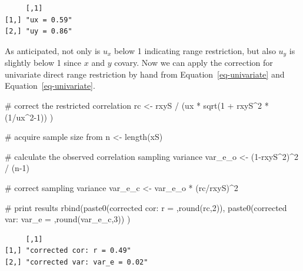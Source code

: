 \documentclass[
  letterpaper,
  DIV=11,
  numbers=noendperiod]{scrreprt}
\newenvironment{Shaded}{\begin{snugshade}}{\end{snugshade}}
\newcommand{\CommentTok}[1]{\textcolor[rgb]{0.37,0.37,0.37}{#1}}
\newcommand{\DecValTok}[1]{\textcolor[rgb]{0.68,0.00,0.00}{#1}}
\newcommand{\FunctionTok}[1]{\textcolor[rgb]{0.28,0.35,0.67}{#1}}
\newcommand{\NormalTok}[1]{\textcolor[rgb]{0.00,0.23,0.31}{#1}}
\newcommand{\OtherTok}[1]{\textcolor[rgb]{0.00,0.23,0.31}{#1}}
\newcommand{\SpecialCharTok}[1]{\textcolor[rgb]{0.37,0.37,0.37}{#1}}
\newcommand{\StringTok}[1]{\textcolor[rgb]{0.13,0.47,0.30}{#1}}
\begin{document}
\begin{verbatim}
     [,1]       
[1,] "ux = 0.59"
[2,] "uy = 0.86"
\end{verbatim}

As anticipated, not only is \(u_x\) below 1 indicating range
restriction, but also \(u_y\) is slightly below 1 since \(x\) and \(y\)
covary. Now we can apply the correction for univariate direct range
restriction by hand from Equation~\ref{eq-univariate} and
Equation~\ref{eq-univariate}.

\begin{Shaded}
\begin{Highlighting}[]
\CommentTok{\# correct the restricted correlation}
\NormalTok{rc }\OtherTok{\textless{}{-}}\NormalTok{ rxyS }\SpecialCharTok{/}\NormalTok{ (ux }\SpecialCharTok{*} \FunctionTok{sqrt}\NormalTok{(}\DecValTok{1} \SpecialCharTok{+}\NormalTok{ rxyS}\SpecialCharTok{\^{}}\DecValTok{2} \SpecialCharTok{*}\NormalTok{ (}\DecValTok{1}\SpecialCharTok{/}\NormalTok{ux}\SpecialCharTok{\^{}}\DecValTok{2{-}1}\NormalTok{)) )}

\CommentTok{\# acquire sample size from }
\NormalTok{n }\OtherTok{\textless{}{-}} \FunctionTok{length}\NormalTok{(xS)}

\CommentTok{\# calculate the observed correlation sampling variance}
\NormalTok{var\_e\_o }\OtherTok{\textless{}{-}}\NormalTok{ (}\DecValTok{1}\SpecialCharTok{{-}}\NormalTok{rxyS}\SpecialCharTok{\^{}}\DecValTok{2}\NormalTok{)}\SpecialCharTok{\^{}}\DecValTok{2} \SpecialCharTok{/}\NormalTok{ (n}\DecValTok{{-}1}\NormalTok{)}

\CommentTok{\# correct sampling variance}
\NormalTok{var\_e\_c }\OtherTok{\textless{}{-}}\NormalTok{ var\_e\_o }\SpecialCharTok{*}\NormalTok{ (rc}\SpecialCharTok{/}\NormalTok{rxyS)}\SpecialCharTok{\^{}}\DecValTok{2}

\CommentTok{\# print results}
\FunctionTok{rbind}\NormalTok{(}\FunctionTok{paste0}\NormalTok{(}\StringTok{\textquotesingle{}corrected cor: r = \textquotesingle{}}\NormalTok{,}\FunctionTok{round}\NormalTok{(rc,}\DecValTok{2}\NormalTok{)),}
      \FunctionTok{paste0}\NormalTok{(}\StringTok{\textquotesingle{}corrected var: var\_e = \textquotesingle{}}\NormalTok{,}\FunctionTok{round}\NormalTok{(var\_e\_c,}\DecValTok{3}\NormalTok{))}
\NormalTok{      )}
\end{Highlighting}
\end{Shaded}

\begin{verbatim}
     [,1]                         
[1,] "corrected cor: r = 0.49"    
[2,] "corrected var: var_e = 0.02"
\end{verbatim}
\end{document}

